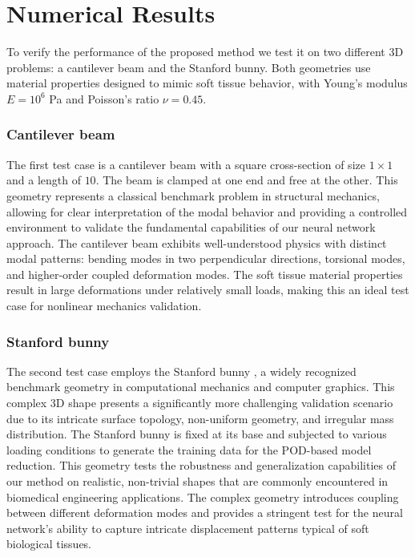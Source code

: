 \section{Numerical Results}
\label{sec:numerical_results}
To verify the performance of the proposed method we test it on two different 3D problems: a cantilever beam and the Stanford bunny. Both geometries use material properties designed to mimic soft tissue behavior, with Young's modulus $E = 10^6$ Pa and Poisson's ratio $\nu = 0.45$.

\subsubsection*{Cantilever beam}
\label{sec:cantilever_beam_setup}
The first test case is a cantilever beam with a square cross-section of size $1 \times 1$ and a length of $10$. The beam is clamped at one end and free at the other. This geometry represents a classical benchmark problem in structural mechanics, allowing for clear interpretation of the modal behavior and providing a controlled environment to validate the fundamental capabilities of our neural network approach. The cantilever beam exhibits well-understood physics with distinct modal patterns: bending modes in two perpendicular directions, torsional modes, and higher-order coupled deformation modes. The soft tissue material properties result in large deformations under relatively small loads, making this an ideal test case for nonlinear mechanics validation.

\subsubsection*{Stanford bunny}
\label{sec:stanford_bunny_setup}
The second test case employs the Stanford bunny \cite{bunny-mesh}, a widely recognized benchmark geometry in computational mechanics and computer graphics. This complex 3D shape presents a significantly more challenging validation scenario due to its intricate surface topology, non-uniform geometry, and irregular mass distribution. The Stanford bunny is fixed at its base and subjected to various loading conditions to generate the training data for the POD-based model reduction. This geometry tests the robustness and generalization capabilities of our method on realistic, non-trivial shapes that are commonly encountered in biomedical engineering applications. The complex geometry introduces coupling between different deformation modes and provides a stringent test for the neural network's ability to capture intricate displacement patterns typical of soft biological tissues.

